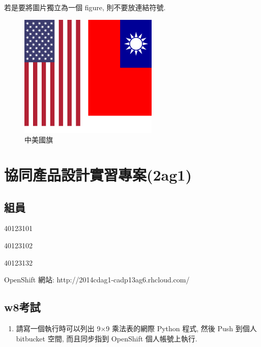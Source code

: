 \documentclass[]{article}
\begin{document}
若是要將圖片獨立為一個 figure, 則不要放連結符號.

\begin{figure}[htbp]
\centering
\includegraphics{./../images/2ag1/c2_w14_task2.png}
\caption{中美國旗}
\end{figure}

\section{協同產品設計實習專案(2ag1)}\label{ux5354ux540cux7522ux54c1ux8a2dux8a08ux5be6ux7fd2ux5c08ux68482ag1}

\subsection{組員}\label{ux7d44ux54e1}

40123101

40123102

40123132

OpenShift 網站: http://2014cdag1-cadp13ag6.rhcloud.com/

\subsection{w8考試}\label{w8ux8003ux8a66}

\begin{enumerate}
\def\labelenumi{\arabic{enumi}.}
\itemsep1pt\parskip0pt
\item
  請寫一個執行時可以列出 9×9 乘法表的網際 Python 程式, 然後 Push 到個人
  bitbucket 空間, 而且同步指到 OpenShift 個人帳號上執行.
\end{enumerate}
\end{document}
